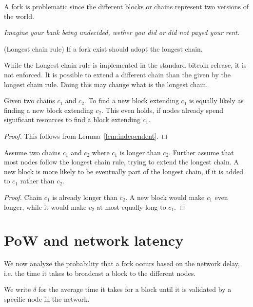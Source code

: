 A fork is problematic since the different blocks or chains represent two versions of the world. 
	
\emph{Imagine your bank being undecided, wether you did or did not payed your rent.}

\begin{definition} (Longest chain rule) If a fork exist should adopt the longest chain.
\end{definition}

\begin{note} While the Longest chain rule is implemented in the standard bitcoin release, it is not enforced. It is possible to extend a different chain than the given by the longest chain rule. Doing this may change what is the longest chain. 
\end{note}

\begin{lem}
	Given two chains $c_1$ and $c_2$. To find a new block extending $c_1$ is equally likely as finding a new block extending $c_2$. This even holds, if nodes already spend significant resources to find a block extending $c_1$.
\end{lem}
\begin{proof} This follows from Lemma~\ref{lem:independent}.
\end{proof}

\begin{lem}
Assume two chains $c_1$ and $c_2$ where $c_1$ is longer than $c_2$. Further assume that most nodes follow the longest chain rule, trying to extend the longest chain.
	A new block is more likely to be eventually part of the longest chain, if it is added to $c_1$ rather than $c_2$.
\end{lem}
\begin{proof}
Chain $c_1$ is already longer than $c_2$. A new block would make $c_1$ even longer, while it would make $c_2$ at most equally long to $c_1$.
\end{proof}

\section{PoW and network latency}
We now analyze the probability that a fork occurs based on the network delay, i.e. the time it takes to broadcast a block to the different nodes.

\begin{definition}
	We write $\delta$ for the average time it takes for a block until it is validated by a specific node in the network.
\end{definition}

